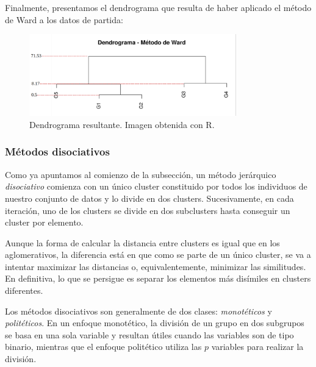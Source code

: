 \begin{ejemplo}
\begin{table}[h]
    \end{table}

    Finalmente, presentamos el dendrograma que resulta de haber aplicado el método de Ward a los datos de partida:

    \begin{figure}[h]
        \centering
        \includegraphics[width=0.8\textwidth]{../img/dendrograma.png}
        \caption{Dendrograma resultante. Imagen obtenida con R.}
    \end{figure}

\end{ejemplo}


\subsubsection{Métodos disociativos}

Como ya apuntamos al comienzo de la subsección, un método jerárquico \textit{disociativo} comienza con un único cluster constituido por todos los individuos
de nuestro conjunto de datos y lo divide en dos clusters. Sucesivamente, en cada iteración, uno de los clusters se divide en dos subclusters hasta conseguir
un cluster por elemento. \newline

Aunque la forma de calcular la distancia entre clusters es igual que en los aglomerativos, la diferencia está en que como se parte de un único cluster, se va
a intentar maximizar las distancias o, equivalentemente, minimizar las similitudes. En definitiva, lo que se persigue es separar los elementos más disímiles en 
clusters diferentes. \newline

Los métodos disociativos son generalmente de dos clases: \textit{monotéticos} y \textit{politéticos}. En un enfoque monotético, la división de un grupo en dos 
subgrupos se basa en una sola variable y resultan útiles cuando las variables son de tipo binario, mientras que el enfoque politético utiliza las $p$ 
variables para realizar la división. \newline

